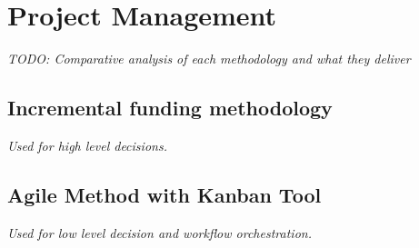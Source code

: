 %
%
\chapter{Project Management}

\textit{TODO: Comparative analysis of each methodology and what they deliver}

\section{Incremental funding methodology}

\textit{Used for high level decisions.}

\section{Agile Method with Kanban Tool}

\textit{Used for low level decision and workflow orchestration.}



\clearpage